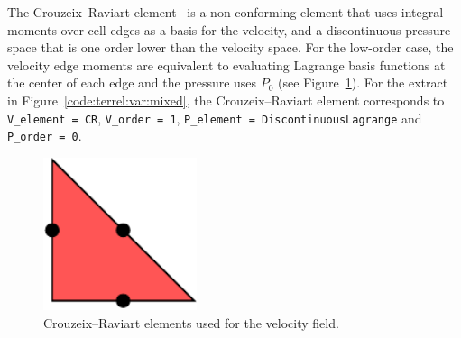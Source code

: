The Crouzeix--Raviart element~\citep{CrouzeixRaviart1973} is a
non-conforming element that uses integral moments over cell
edges as a basis for the velocity, and a discontinuous pressure space
that is one order lower than the velocity space.  For the low-order case,
the velocity edge moments are equivalent to evaluating Lagrange basis
functions at the center of each edge and the pressure uses $P_0$
(see Figure~\ref{fig:terrel:CRElements}).  For the extract in
Figure~\ref{code:terrel:var:mixed},
the Crouzeix--Raviart element corresponds to
{\tt V\_element = CR}, {\tt V\_order = 1},
{\tt P\_element = DiscontinuousLagrange} and {\tt P\_order = 0}.
%
\begin{figure}
  \center
  \includegraphics[width=0.4\textwidth]{chapters/kirby-6/pdf/CR1.pdf}
  \caption{Crouzeix--Raviart elements used for the velocity field.}
  \label{fig:terrel:CRElements}
\end{figure}

